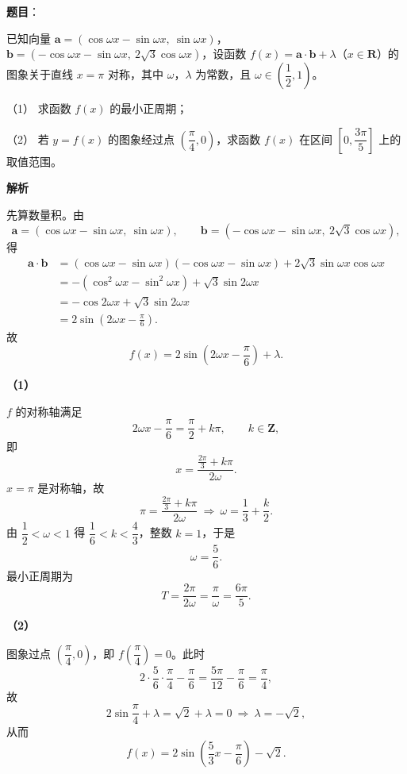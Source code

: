 \begin{answer}

\textbf{题目}：

已知向量 $\boldsymbol a=(\cos\omega x-\sin\omega x,\ \sin\omega x)$，$\boldsymbol b=(-\cos\omega x-\sin\omega x,\ 2\sqrt3\cos\omega x)$，设函数 $f(x)=\boldsymbol a\cdot\boldsymbol b+\lambda$（$x\in\mathbf R$）的图象关于直线 $x=\pi$ 对称，其中 $\omega$，$\lambda$ 为常数，且 $\omega\in\left(\dfrac12,1\right)$。

（1） 求函数 $f(x)$ 的最小正周期；

（2） 若 $y=f(x)$ 的图象经过点 $\left(\dfrac{\pi}{4},0\right)$，求函数 $f(x)$ 在区间 $\left[0,\dfrac{3\pi}{5}\right]$ 上的取值范围。

\textbf{解析}

先算数量积。由
\nopagebreak[4]
\[\boldsymbol a=(\cos\omega x-\sin\omega x,\ \sin\omega x),\qquad
\boldsymbol b=(-\cos\omega x-\sin\omega x,\ 2\sqrt3\cos\omega x),\]
得
\nopagebreak[4]
\[\begin{aligned}
\boldsymbol a\cdot\boldsymbol b
&=(\cos\omega x-\sin\omega x)(-\cos\omega x-\sin\omega x)+2\sqrt3\sin\omega x\cos\omega x\\
&=-\left(\cos^2\omega x-\sin^2\omega x\right)+\sqrt3\sin2\omega x\\
&=-\cos2\omega x+\sqrt3\sin2\omega x\\
&=2\sin\left(2\omega x-\frac\pi6\right).
\end{aligned}\]
故
\nopagebreak[4]
\[f(x)=2\sin\left(2\omega x-\frac\pi6\right)+\lambda.\]

\textbf{（1）}

$f$ 的对称轴满足
\nopagebreak[4]
\[2\omega x-\frac\pi6=\frac\pi2+k\pi,\qquad k\in\mathbf Z,\]
即
\nopagebreak[4]
\[x=\frac{\frac{2\pi}{3}+k\pi}{2\omega}.\]
$x=\pi$ 是对称轴，故
\nopagebreak[4]
\[\pi=\frac{\frac{2\pi}{3}+k\pi}{2\omega}\ \Longrightarrow\ \omega=\frac13+\frac k2.\]
由 $\dfrac12<\omega<1$ 得 $\dfrac16<k<\dfrac43$，整数 $k=1$，于是
\nopagebreak[4]
\[\omega=\frac56.\]
最小正周期为
\nopagebreak[4]
\[T=\frac{2\pi}{2\omega}=\frac{\pi}{\omega}=\frac{6\pi}{5}.\]

\textbf{（2）}

图象过点 $\left(\dfrac\pi4,0\right)$，即 $f\left(\dfrac\pi4\right)=0$。此时
\nopagebreak[4]
\[2\cdot\frac56\cdot\frac\pi4-\frac\pi6=\frac{5\pi}{12}-\frac{\pi}{6}=\frac\pi4,\]
故
\nopagebreak[4]
\[2\sin\frac\pi4+\lambda=\sqrt2+\lambda=0\ \Longrightarrow\ \lambda=-\sqrt2,\]
从而
\nopagebreak[4]
\[f(x)=2\sin\left(\frac53x-\frac\pi6\right)-\sqrt2.\]


\end{answer}

